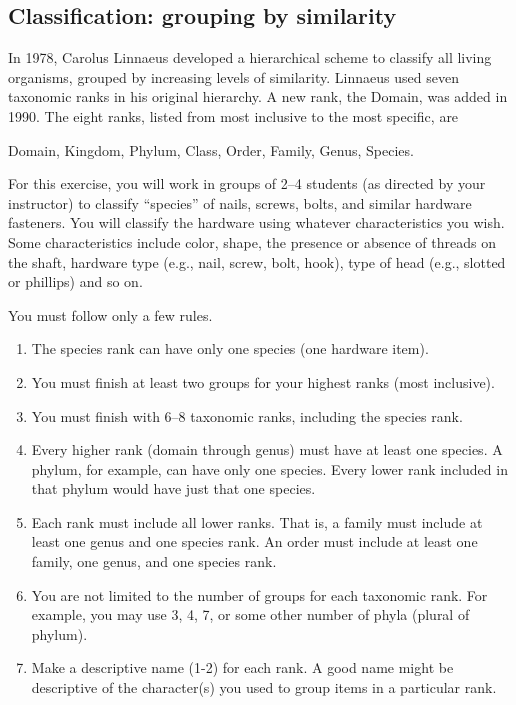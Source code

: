 \documentclass[12pt]{exam}
\newlength{\myindent}
\newcommand{\ind}{\hspace*{\myindent}}
\begin{document}
\subsection*{Classification: grouping by similarity }

In 1978, Carolus Linnaeus developed a hierarchical scheme to classify all living organisms, grouped by increasing levels of similarity. Linnaeus used seven taxonomic ranks in his original hierarchy. A new rank, the Domain, was added in 1990.  The eight ranks, listed from most inclusive to the most specific, are

\ind Domain, Kingdom, Phylum, Class, Order, Family, Genus, Species.

For this exercise, you will work in groups of 2–4 students (as directed by your instructor) to classify “species” of nails, screws, bolts, and similar hardware fasteners. You will classify the hardware using whatever characteristics you wish. Some characteristics include color, shape, the presence or absence of threads on the shaft, hardware type (e.g., nail, screw, bolt, hook), type of head (e.g., slotted or phillips) and so on. 

You must follow only a few rules.

\begin{enumerate}

	\item The species rank can have only one species (one hardware item). 
	
	\item You must finish at least two groups for your highest ranks (most inclusive).
	
	\item You must finish with 6–8 taxonomic ranks, including the species rank.
	
	\item Every higher rank (domain through genus) must have at least one species. A phylum, for example, can have only one species. Every lower rank included in that phylum would have just that one species.
	
	\item Each rank must include all lower ranks. That is, a family must include at least one genus and one species rank. An order must include at least one family, one genus, and one species rank.
	
	\item You are not limited to the number of groups for each taxonomic rank. For example, you may use 3, 4, 7, or some other number of  phyla (plural of phylum).
	
	\item Make a descriptive name (1-2) for each rank. A good name might be descriptive of the character(s) you used to group items in a particular rank.

\end{enumerate}
\end{document}

